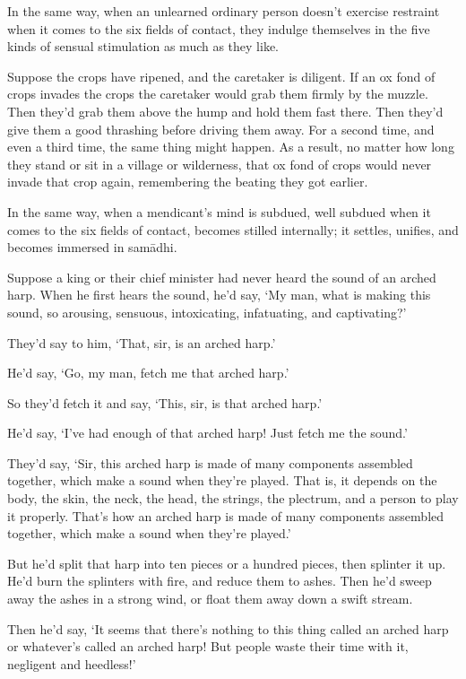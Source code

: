 \documentclass[12pt,openany]{book}%
\begin{document}
In the same way, when an unlearned ordinary person doesn’t exercise restraint when it comes to the six fields of contact, they indulge themselves in the five kinds of sensual stimulation as much as they like. 

Suppose the crops have ripened, and the caretaker is diligent. If an ox fond of crops invades the crops the caretaker would grab them firmly by the muzzle. Then they’d grab them above the hump and hold them fast there. Then they’d give them a good thrashing before driving them away. For a second time, and even a third time, the same thing might happen. As a result, no matter how long they stand or sit in a village or wilderness, that ox fond of crops would never invade that crop again, remembering the beating they got earlier. 

In the same way, when a mendicant’s mind is subdued, well subdued when it comes to the six fields of contact, becomes stilled internally; it settles, unifies, and becomes immersed in \textsanskrit{samādhi}. 

Suppose a king or their chief minister had never heard the sound of an arched harp. When he first hears the sound, he’d say, ‘My man, what is making this sound, so arousing, sensuous, intoxicating, infatuating, and captivating?’ 

They’d say to him, ‘That, sir, is an arched harp.’ 

He’d say, ‘Go, my man, fetch me that arched harp.’ 

So they’d fetch it and say, ‘This, sir, is that arched harp.’ 

He’d say, ‘I’ve had enough of that arched harp! Just fetch me the sound.’ 

They’d say, ‘Sir, this arched harp is made of many components assembled together, which make a sound when they’re played. That is, it depends on the body, the skin, the neck, the head, the strings, the plectrum, and a person to play it properly. That’s how an arched harp is made of many components assembled together, which make a sound when they’re played.’ 

But he’d split that harp into ten pieces or a hundred pieces, then splinter it up. He’d burn the splinters with fire, and reduce them to ashes. Then he’d sweep away the ashes in a strong wind, or float them away down a swift stream. 

Then he’d say, ‘It seems that there’s nothing to this thing called an arched harp or whatever’s called an arched harp! But people waste their time with it, negligent and heedless!’ 
\end{document}
